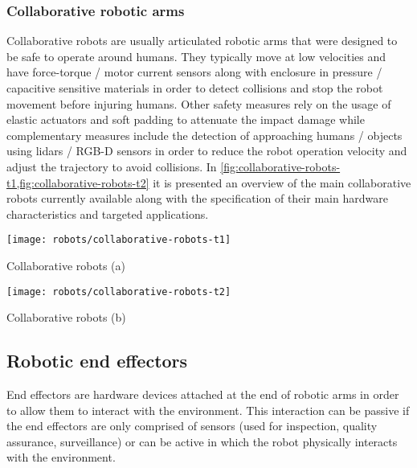 \subsubsection{Collaborative robotic arms}

Collaborative robots are usually articulated robotic arms that were designed to be safe \cite{Haddadin2011,Ceriani2014} to operate around humans. They typically move at low velocities and have force-torque / motor current sensors along with enclosure in pressure / capacitive sensitive materials in order to detect collisions and stop the robot movement before injuring humans. Other safety measures rely on the usage of elastic actuators and soft padding to attenuate the impact damage while complementary measures include the detection of approaching humans / objects using \glspl{lidar} / RGB-D sensors in order to reduce the robot operation velocity and adjust the trajectory to avoid collisions. In \cref{fig:collaborative-robots-t1,fig:collaborative-robots-t2} it is presented an overview of the main collaborative robots currently available along with the specification of their main hardware characteristics and targeted applications.



\begin{table}[H]
	\centering
	\texttt{[image: robots/collaborative-robots-t1]}
	\caption[Collaborative robots (a)]{Collaborative robots (a) \cite{Mathieu2015}}
	\label{fig:collaborative-robots-t1}
\end{table}

\begin{table}[H]
	\centering
	\texttt{[image: robots/collaborative-robots-t2]}
	\caption[Collaborative robots (b)]{Collaborative robots (b) \cite{Mathieu2015}}
	\label{fig:collaborative-robots-t2}
\end{table}


\subsection{Robotic end effectors}

End effectors are hardware devices attached at the end of robotic arms in order to allow them to interact with the environment. This interaction can be passive if the end effectors are only comprised of sensors (used for inspection, quality assurance, surveillance) or can be active in which the robot physically interacts with the environment.

